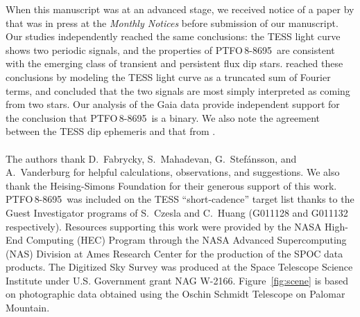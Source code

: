 \documentclass[12pt,twocolumn,tighten]{aastex62}
\newcommand{\ptfo}{PTFO$\,$8-8695}
\begin{document}

\acknowledgements
When this manuscript was at an advanced stage, we received notice of a
paper by \citet{koen_2020} that was in press at the {\it Monthly
Notices} before submission of our manuscript.  Our studies
independently reached the same conclusions: the TESS light curve shows
two periodic signals, and the properties of \ptfo\ are consistent with
the emerging class of transient and persistent flux dip stars.
\citet{koen_2020} reached these conclusions by modeling the TESS light
curve as a truncated sum of Fourier terms, and concluded that the two
signals are most simply interpreted as coming from two stars.  Our
analysis of the Gaia data provide independent support for the
conclusion that \ptfo\ is a binary. We also note the agreement between
the TESS dip ephemeris and that from \citet{tanimoto_evidence_2020}.
\\
\\
%
%
%
The authors thank D.~Fabrycky, S.~Mahadevan, G.~Stef\'ansson, and
A.~Vanderburg for helpful calculations, observations, and suggestions.
%
We also thank the Heising-Simons Foundation for
their generous support of this work.
%
\ptfo\ was included on the TESS ``short-cadence'' target list thanks
to the Guest Investigator programs of S.\ Czesla and C.\ Huang
(G011128 and G011132 respectively).
%
Resources supporting this work were provided by the NASA High-End Computing (HEC) Program through the NASA Advanced Supercomputing (NAS) Division at Ames Research Center for the production of the SPOC data products.
%
The Digitized Sky Survey was produced at the Space Telescope Science
Institute under U.S. Government grant NAG W-2166.
Figure~\ref{fig:scene} is based on photographic data obtained using
the Oschin Schmidt Telescope on Palomar Mountain.
%
\end{document}
